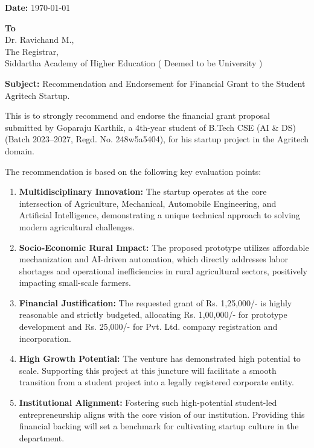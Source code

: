 \documentclass[12pt,a4paper]{article}
\begin{document}
\pagestyle{empty}



\begin{flushright}
    \textbf{Date:} \today \\
\end{flushright}

\noindent \textbf{To} \\
Dr. Ravichand M., \\
The Registrar, \\
Siddartha Academy of Higher Education ( Deemed to be University ) \\

\vspace{1.5em}

\noindent \textbf{Subject:} Recommendation and Endorsement for Financial Grant to the Student Agritech Startup.

\vspace{1.5em}

\noindent This is to strongly recommend and endorse the financial grant proposal submitted by Goparaju Karthik, a 4th-year student of B.Tech CSE (AI \& DS) (Batch 2023--2027, Regd. No. 248w5a5404), for his startup project in the Agritech domain. 

\vspace{1em}
\noindent The recommendation is based on the following key evaluation points:

\begin{enumerate}
    \item \textbf{Multidisciplinary Innovation:} The startup operates at the core intersection of Agriculture, Mechanical, Automobile Engineering, and Artificial Intelligence, demonstrating a unique technical approach to solving modern agricultural challenges.
    \item \textbf{Socio-Economic Rural Impact:} The proposed prototype utilizes affordable mechanization and AI-driven automation, which directly addresses labor shortages and operational inefficiencies in rural agricultural sectors, positively impacting small-scale farmers.
    \item \textbf{Financial Justification:} The requested grant of Rs. 1,25,000/- is highly reasonable and strictly budgeted, allocating Rs. 1,00,000/- for prototype development and Rs. 25,000/- for Pvt. Ltd. company registration and incorporation.
    \item \textbf{High Growth Potential:} The venture has demonstrated high potential to scale. Supporting this project at this juncture will facilitate a smooth transition from a student project into a legally registered corporate entity.
    \item \textbf{Institutional Alignment:} Fostering such high-potential student-led entrepreneurship aligns with the core vision of our institution. Providing this financial backing will set a benchmark for cultivating startup culture in the department.
\end{enumerate}
\end{document}
